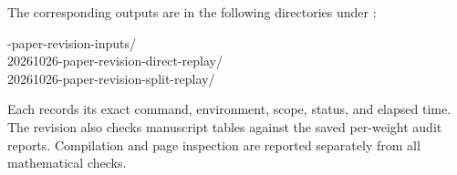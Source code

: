 The corresponding outputs are in the following directories under
:
\begin{center}\small{}-paper-revision-inputs/\\
20261026-paper-revision-direct-replay/\\
20261026-paper-revision-split-replay/
\end{center}
Each  records its exact command, environment, scope,
status, and elapsed time. The revision also checks manuscript tables
against the saved per-weight audit reports. Compilation and page inspection
are reported separately from all mathematical checks.
